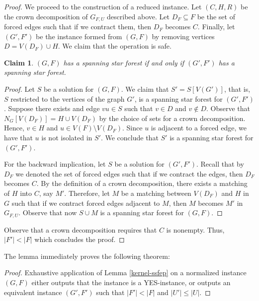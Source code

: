 \documentclass[en]{pracamgr}
\newtheorem{claim}{Claim}
\theoremstyle{definition}
\begin{document}
\begin{proof}
	We proceed to the construction of a reduced instance. Let $(C,H,R)$ be the crown decomposition of $G_{F,U}$ described above. Let $D_F \subseteq F$ be the set of forced edges such that if we contract them, then $D_F$ becomes $C$. Finally, let $(G',F')$ be the instance formed from $(G,F)$ by removing vertices $D=V(D_F) \cup H$. We claim that the operation is safe.
	
	\begin{claim}
		$(G,F)$ has a spanning star forest if and only if $(G',F')$ has a spanning star forest.
	\end{claim}
	\begin{proof}		
		Let $S$ be a solution for $(G,F)$. We claim that $S' = S[V(G')]$, that is, $S$ restricted to the vertices of the graph $G'$, is a spanning star forest for $(G',F')$. Suppose there exists and edge $vu \in S$ such that $v \in D$ and $v \notin D$. Observe that $N_G[V(D_F)] = H \cup V(D_F)$ by the choice of sets for a crown decomposition. Hence, $v \in H$ and $u \in V(F) \setminus V(D_F)$. Since $u$ is adjacent to a forced edge, we have that $u$ is not isolated in $S'$. We conclude that $S'$ is a spanning star forest for $(G',F')$.
		
		For the backward implication, let $S$ be a solution for $(G',F')$. Recall that by $D_F$ we denoted the set of forced edges such that if we contract the edges, then $D_F$ becomes $C$. By the definition of a crown decomposition, there exists a matching of $H$ into $C$, say $M'$. Therefore, let $M$ be a matching between $V(D_F)$ and $H$ in $G$ such that if we contract forced edges adjacent to $M$, then $M$ becomes $M'$ in $G_{F,U}$. Observe that now $S \cup M$ is a spanning star forest for $(G,F)$.
	\end{proof}
	
	Observe that a crown decomposition requires that $C$ is nonempty. Thus, $|F'| < |F|$ which concludes the proof. \qedhere
	
\end{proof}

The lemma immediately proves the following theorem:

\thmssfepkernel*

\begin{proof}
	Exhaustive application of Lemma \ref{kernel-ssfep} on a normalized instance $(G,F)$ either outputs that the instance is a YES-instance, or outputs an equivalent instance $(G',F')$ such that $|F'| < |F|$ and $|U'| \leq |U|$.
\end{proof}
\end{document}
